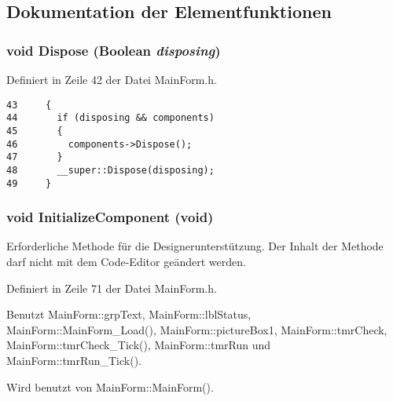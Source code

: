 \subsection{Dokumentation der Elementfunktionen}
\hypertarget{classQbeNDI_1_1MainForm_QbeNDI_1_1MainFormb0}{
\subsubsection[Dispose]{\setlength{\rightskip}{0pt plus 5cm}void Dispose (Boolean {\em disposing})}}
\label{classQbeNDI_1_1MainForm_QbeNDI_1_1MainFormb0}




Definiert in Zeile 42 der Datei Main\-Form.h.



\footnotesize\begin{verbatim}43     {
44       if (disposing && components)
45       {
46         components->Dispose();
47       }
48       __super::Dispose(disposing);
49     }
\end{verbatim}\normalsize 
\hypertarget{classQbeNDI_1_1MainForm_QbeNDI_1_1MainFormd0}{
\subsubsection[InitializeComponent]{\setlength{\rightskip}{0pt plus 5cm}void Initialize\-Component (void)}}
\label{classQbeNDI_1_1MainForm_QbeNDI_1_1MainFormd0}


Erforderliche Methode f\"{u}r die Designerunterst\"{u}tzung. Der Inhalt der Methode darf nicht mit dem Code-Editor ge\"{a}ndert werden.  

Definiert in Zeile 71 der Datei Main\-Form.h.

Benutzt Main\-Form::grp\-Text, Main\-Form::lbl\-Status, Main\-Form::Main\-Form\_\-Load(), Main\-Form::picture\-Box1, Main\-Form::tmr\-Check, Main\-Form::tmr\-Check\_\-Tick(), Main\-Form::tmr\-Run und Main\-Form::tmr\-Run\_\-Tick().

Wird benutzt von Main\-Form::Main\-Form().



